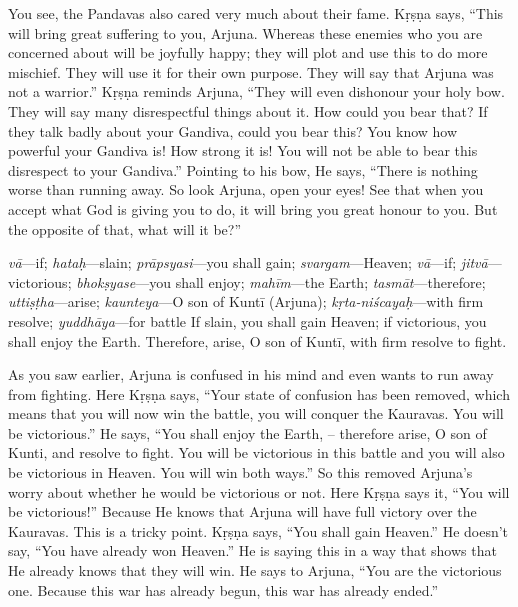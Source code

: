 You see, the Pandavas also cared very much about their fame. Kṛṣṇa says, “This will bring great suffering to you, Arjuna. Whereas these enemies who you are concerned about will be joyfully happy; they will plot and use this to do more mischief. They will use it for their own purpose. They will say that Arjuna was not a warrior.” Kṛṣṇa reminds Arjuna, “They will even dishonour your holy bow. They will say many disrespectful things about it. How could you bear that? If they talk badly about your Gandiva, could you bear this? You know how powerful your Gandiva is! How strong it is! You will not be able to bear this disrespect to your Gandiva.” Pointing to his bow, He says, “There is nothing worse than running away. So look Arjuna, open your eyes! See that when you accept what God is giving you to do, it will bring you great honour to you. But the opposite of that, what will it be?”

{%
  \textit{vā}---if; 
  \textit{hataḥ}---slain; 
  \textit{prāpsyasi}---you shall gain; 
  \textit{svargam}---Heaven; 
  \textit{vā}---if; 
  \textit{jitvā}---victorious; 
  \textit{bhokṣyase}---you shall enjoy; 
  \textit{mahīm}---the Earth; 
  \textit{tasmāt}---therefore; 
  \textit{uttiṣṭha}---arise; 
  \textit{kaunteya}---O son of Kuntī (Arjuna); 
  \textit{kṛta-niścayaḥ}---with firm resolve; 
  \textit{yuddhāya}---for battle
}
{%
  If slain, you shall gain Heaven; if victorious, you shall enjoy the Earth. Therefore, arise, O son of Kuntī, with firm resolve to fight.
}

As you saw earlier, Arjuna is confused in his mind and even wants to run away from fighting. Here Kṛṣṇa says, “Your state of confusion has been removed, which means that you will now win the battle, you will conquer the Kauravas. You will be victorious.” He says, “You shall enjoy the Earth, – therefore arise, O son of Kunti, and resolve to fight. You will be victorious in this battle and you will also be victorious in Heaven. You will win both ways.” So this removed Arjuna’s worry about whether he would be victorious or not. Here Kṛṣṇa says it, “You will be victorious!” Because He knows that Arjuna will have full victory over the Kauravas. This is a tricky point. Kṛṣṇa says, “You shall gain Heaven.” He doesn’t say, “You have already won Heaven.” He is saying this in a way that shows that He already knows that they will win. He says to Arjuna, “You are the victorious one. Because this war has already begun, this war has already ended.”

